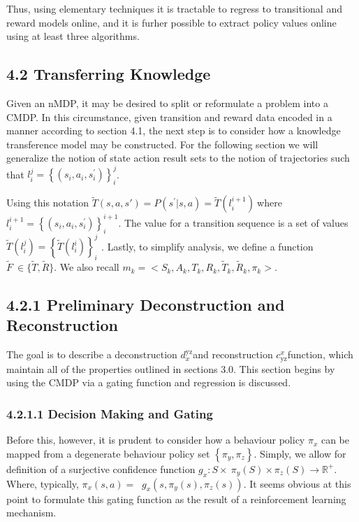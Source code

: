 \documentclass[]{article}
\begin{document}
Thus, using elementary techniques it is tractable to regress to
transitional and reward models online, and it is furher possible to
extract policy values online using at least three algorithms.

\subsection{4.2 Transferring Knowledge}\label{transferring-knowledge}

Given an nMDP, it may be desired to split or reformulate a problem into
a CMDP. In this circumstance, given transition and reward data encoded
in a manner according to section 4.1, the next step is to consider how a
knowledge transference model may be constructed. For the following
section we will generalize the notion of state action result sets to the
notion of trajectories such that
\(l_{i}^{j} = \left\{ (s_{i},a_{i},s_{i}^{'}) \right\}_{i}^{j}\).

Using this notation
\(\tilde{T}\left( s,a,s' \right) = P\left( s^{'}|s,a \right) = \tilde{T}\left( l_{i}^{i + 1} \right)\ \)where
\(l_{i}^{i + 1} = \left\{ (s_{i},a_{i},s_{i}^{'}) \right\}_{i}^{i + 1}\).
The value for a transition sequence is a set of values
\(\tilde{T}\left( l_{i}^{j} \right) = \left\{ \tilde{T}\left( l_{i}^{i} \right) \right\}_{i}^{j}\)
. Lastly, to simplify analysis, we define a function
\(\tilde{F}\  \in \{\tilde{T},\tilde{R}\}\). We also recall
\(m_{k} = < S_{k},A_{k},T_{k},R_{k},{\tilde{T}}_{k},{\tilde{R}}_{k},\pi_{k} >\).

\subsection{4.2.1 Preliminary Deconstruction and Reconstruction
}\label{preliminary-deconstruction-and-reconstruction}

The goal is to describe a deconstruction \(d_{x}^{\text{yz}}\)and
reconstruction \(c_{\text{yz}}^{x}\)function, which maintain all of the
properties outlined in sections 3.0. This section begins by using the
CMDP via a gating function and regression is discussed.

\subsubsection{4.2.1.1 Decision Making and
Gating}\label{decision-making-and-gating}

Before this, however, it is prudent to consider how a behaviour policy
\(\pi_{x}\) can be mapped from a degenerate behaviour policy set
\(\left\{ \pi_{y},\pi_{z} \right\}\). Simply, we allow for definition of
a surjective confidence function
\(g_{x}:S \times \ \pi_{y}(S) \times \pi_{z}(S) \rightarrow \mathbb{R}^{+}\).
Where, typically,
\(\pi_{x}\left( s,a \right) = \operatorname{}{g_{x}\left( s,\pi_{y}\left( s \right),\pi_{z}(s) \right)}\).
It seems obvious at this point to formulate this gating function as the
result of a reinforcement learning mechanism.
\end{document}
